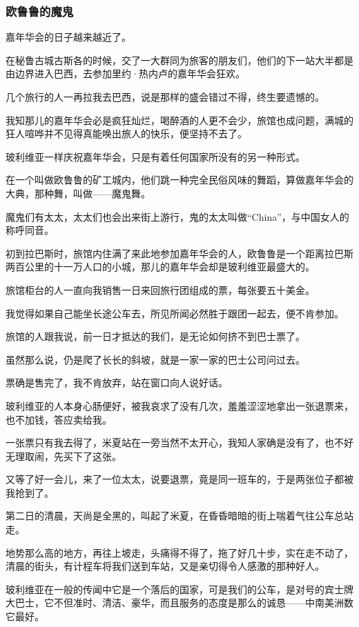 \subsubsection*{欧鲁鲁的魔鬼}
\par 嘉年华会的日子越来越近了。
\par 在秘鲁古城古斯各的时候，交了一大群同为旅客的朋友们，他们的下一站大半都是由边界进入巴西，去参加里约·热内卢的嘉年华会狂欢。
\par 几个旅行的人一再拉我去巴西，说是那样的盛会错过不得，终生要遗憾的。
\par 我知那儿的嘉年华会必是疯狂灿烂，喝醉酒的人更不会少，旅馆也成问题，满城的狂人喧哗并不见得真能唤出旅人的快乐，便坚持不去了。
\par 玻利维亚一样庆祝嘉年华会，只是有着任何国家所没有的另一种形式。
\par 在一个叫做欧鲁鲁的矿工城内，他们跳一种完全民俗风味的舞蹈，算做嘉年华会的大典，那种舞，叫做——魔鬼舞。
\par 魔鬼们有太太，太太们也会出来街上游行，鬼的太太叫做“China”，与中国女人的称呼同音。
\par 初到拉巴斯时，旅馆内住满了来此地参加嘉年华会的人，欧鲁鲁是一个距离拉巴斯两百公里的十一万人口的小城，那儿的嘉年华会却是玻利维亚最盛大的。
\par 旅馆柜台的人一直向我销售一日来回旅行团组成的票，每张要五十美金。
\par 我觉得如果自己能坐长途公车去，所见所闻必然胜于跟团一起去，便不肯参加。
\par 旅馆的人跟我说，前一日才抵达的我们，是无论如何挤不到巴士票了。
\par 虽然那么说，仍是爬了长长的斜坡，就是一家一家的巴士公司问过去。
\par 票确是售完了，我不肯放弃，站在窗口向人说好话。
\par 玻利维亚的人本身心肠便好，被我哀求了没有几次，羞羞涩涩地拿出一张退票来，也不加钱，答应卖给我。
\par 一张票只有我去得了，米夏站在一旁当然不太开心，我知人家确是没有了，也不好无理取闹，先买下了这张。
\par 又等了好一会儿，来了一位太太，说要退票，竟是同一班车的，于是两张位子都被我抢到了。
\par 第二日的清晨，天尚是全黑的，叫起了米夏，在昏昏暗暗的街上喘着气往公车总站走。
\par 地势那么高的地方，再往上坡走，头痛得不得了，拖了好几十步，实在走不动了，清晨的街头，有计程车将我们送到车站，又是亲切得令人感激的那种好人。
\par 玻利维亚在一般的传闻中它是一个落后的国家，可是我们的公车，是对号的宾士牌大巴士，它不但准时、清洁、豪华，而且服务的态度是那么的诚恳——中南美洲数它最好。
